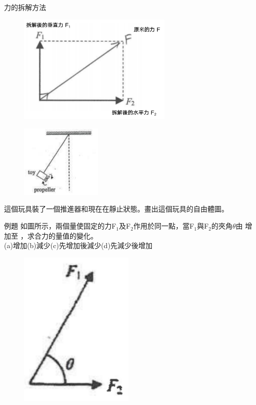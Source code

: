 \documentclass[beamer=true]{standalone}
\begin{document}
\begin{frame}{力的拆解方法}
    \begin{figure}[h!]
        \centering
        \includegraphics[width=0.66\textwidth]{assets/8695f254.png}
    \end{figure}
\end{frame}

\begin{eg}
    \begin{figure}[h!]
        \centering
        \includegraphics[width=0.35\textwidth]{assets/d7d1a80b.png}
    \end{figure}\bigskip\bigskip
    這個玩具裝了一個推進器和現在在靜止狀態。畫出這個玩具的自由體圖。
\end{eg}

\begin{frame}[t]{例題}
    如圖所示，兩個量使固定的力F$_1$及F$_2$作用於同一點，當F$_1$與F$_2$的夾角$\theta$由  增加至 ，求合力的量值的變化。\\(a)增加(b)減少(c)先增加後減少(d)先減少後增加
    \begin{figure}[h!]
        \centering
        \includegraphics[width=.22\textwidth]{assets/11bd149b.png}
    \end{figure}
\end{frame}
\end{document}
